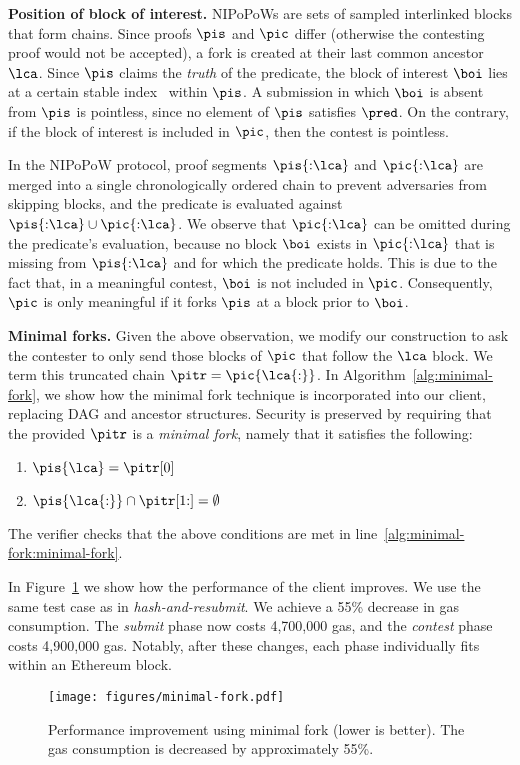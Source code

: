 \noindent \textbf{Position of block of interest.} NIPoPoWs are sets of sampled
interlinked blocks that form chains. Since proofs
$\pis$ and $\pic$ differ (otherwise the contesting proof would not be accepted),
a fork is created at
their last common ancestor $\lca$. Since $\pis$ claims the \emph{truth} of the
predicate, the block of interest $\boi$ lies at a certain
stable index~\cite{nipopows,generic-client} within $\pis$. A submission in which $\boi$ is
absent from $\pis$ is pointless, since no element
of $\pis$ satisfies $\pred$. On the contrary, if the block of
interest is included in $\pic$, then the contest is pointless.

\newcommand{\block}{\mathsf{B}}

In the NIPoPoW protocol, proof segments $\pis\{{{:}}\lca\}$ and
$\pic\{{:}\lca\}$ are merged into a single chronologically ordered chain to prevent adversaries from skipping
blocks, and the predicate is evaluated against $\pis\{{:}\lca\} \cup
\pic\{{:}\lca\}$. We observe that $\pic\{{:}\lca\}$ can be omitted during the predicate's evaluation, because no
block $\boi$ exists in $\pic\{{:}\lca\}$ that is missing from $\pis\{{:}\lca\}$
and for which the predicate holds. This is due to the fact that, in a meaningful contest, $\boi$
is not included in $\pic$. Consequently, $\pic$ is only meaningful if it forks
$\pis$ at a block prior to $\boi$.

\noindent \textbf{Minimal forks.} Given the above observation, we modify our construction
to ask the contester to only send those blocks of $\pic$ that follow the $\lca$ block.
We term this truncated chain $\pitr = \pic\{\lca{:}\}$.
In Algorithm~\ref{alg:minimal-fork}, we show how the minimal fork technique is
incorporated into our client, replacing DAG and ancestor structures.
Security is preserved by requiring that the provided $\pitr$ is a \emph{minimal fork}, namely
that it satisfies the following:

\begin{enumerate}
\item $\pis\{\lca\} = \pitr[0]$
\item $\pis\{\lca{:}\} \cap \pitr[1{:}] = \emptyset$
\end{enumerate}

The verifier checks that the above conditions are met in line~\ref{alg:minimal-fork:minimal-fork}.

In
Figure~\ref{fig:minimal-fork} we show how the performance of the client
improves. We use the same test case as in \emph{hash-and-resubmit}.
We achieve a 55\% decrease in gas
consumption. The \emph{submit} phase now costs {4{,}700{,}000} gas, and
the \emph{contest} phase costs {4{,}900{,}000} gas. Notably, after these
changes, each phase individually fits within an Ethereum block.



\begin{figure}
    \centering
    \texttt{[image: figures/minimal-fork.pdf]}
    \caption{Performance improvement using minimal fork (lower is better). The
        gas consumption is decreased by approximately 55\%.}
    \label{fig:minimal-fork}
\end{figure}
